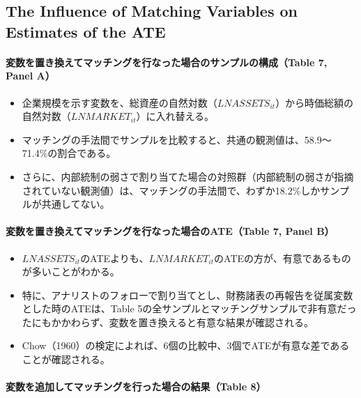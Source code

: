 \subsection*{The Influence of Matching Variables on Estimates of the ATE}

\paragraph{変数を置き換えてマッチングを行なった場合のサンプルの構成（Table 7, Panel A）}

\begin{itemize}
 \item 企業規模を示す変数を、総資産の自然対数（$\mathit{LNASSETS}_{it}$）から時価総額の自然対数（$\mathit{LNMARKET}_{it}$）に入れ替える。
 \item マッチングの手法間でサンプルを比較すると、共通の観測値は、58.9〜71.4\%の割合である。
 \item さらに、内部統制の弱さで割り当てた場合の対照群（内部統制の弱さが指摘されていない観測値）は、マッチングの手法間で、わずか18.2\%しかサンプルが共通してない。
\end{itemize}

\paragraph{変数を置き換えてマッチングを行なった場合のATE（Table 7, Panel B）}

\begin{itemize}
 \item $\mathit{LNASSETS}_{it}$のATEよりも、$\mathit{LNMARKET}_{it}$のATEの方が、有意であるものが多いことがわかる。
 \item 特に、アナリストのフォローで割り当てとし、財務諸表の再報告を従属変数とした時のATEは、Table 5の全サンプルとマッチングサンプルで非有意だったにもかかわらず、変数を置き換えると有意な結果が確認される。
 \item Chow（1960）の検定によれば、6個の比較中、3個でATEが有意な差であることが確認される。
\end{itemize}

\paragraph{変数を追加してマッチングを行った場合の結果（Table 8）}

